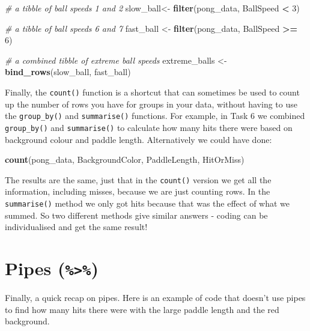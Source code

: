 \documentclass[]{book}
\newenvironment{Shaded}{\begin{snugshade}}{\end{snugshade}}
\newcommand{\CommentTok}[1]{\textcolor[rgb]{0.56,0.35,0.01}{\textit{#1}}}
\newcommand{\DecValTok}[1]{\textcolor[rgb]{0.00,0.00,0.81}{#1}}
\newcommand{\KeywordTok}[1]{\textcolor[rgb]{0.13,0.29,0.53}{\textbf{#1}}}
\newcommand{\NormalTok}[1]{#1}
\newcommand{\OperatorTok}[1]{\textcolor[rgb]{0.81,0.36,0.00}{\textbf{#1}}}
\newcommand{\StringTok}[1]{\textcolor[rgb]{0.31,0.60,0.02}{#1}}
\begin{document}
\begin{Shaded}
\begin{Highlighting}[]
\CommentTok{# a tibble of ball speeds 1 and 2}
\NormalTok{slow_ball<-}\StringTok{ }\KeywordTok{filter}\NormalTok{(pong_data, BallSpeed }\OperatorTok{<}\StringTok{ }\DecValTok{3}\NormalTok{) }

\CommentTok{# a tibble of ball speeds 6 and 7}
\NormalTok{fast_ball <-}\StringTok{ }\KeywordTok{filter}\NormalTok{(pong_data, BallSpeed }\OperatorTok{>=}\StringTok{ }\DecValTok{6}\NormalTok{) }

\CommentTok{# a combined tibble of extreme ball speeds}
\NormalTok{extreme_balls <-}\StringTok{ }\KeywordTok{bind_rows}\NormalTok{(slow_ball, fast_ball) }
\end{Highlighting}
\end{Shaded}

Finally, the \texttt{count()} function is a shortcut that can sometimes be used to count up the number of rows you have for groups in your data, without having to use the \texttt{group\_by()} and \texttt{summarise()} functions. For example, in Task 6 we combined \texttt{group\_by()} and \texttt{summarise()} to calculate how many hits there were based on background colour and paddle length. Alternatively we could have done:

\begin{Shaded}
\begin{Highlighting}[]
\KeywordTok{count}\NormalTok{(pong_data, BackgroundColor, PaddleLength, HitOrMiss)}
\end{Highlighting}
\end{Shaded}

The results are the same, just that in the \texttt{count()} version we get all the information, including misses, because we are just counting rows. In the \texttt{summarise()} method we only got hits because that was the effect of what we summed. So two different methods give similar answers - coding can be individualised and get the same result!

\hypertarget{pipes}{%
\section{\texorpdfstring{Pipes (\textbf{\texttt{\%\textgreater{}\%}})}{Pipes (\%\textgreater{}\%)}}\label{pipes}}

Finally, a quick recap on pipes. Here is an example of code that doesn't use pipes to find how many hits there were with the large paddle length and the red background.
\end{document}
